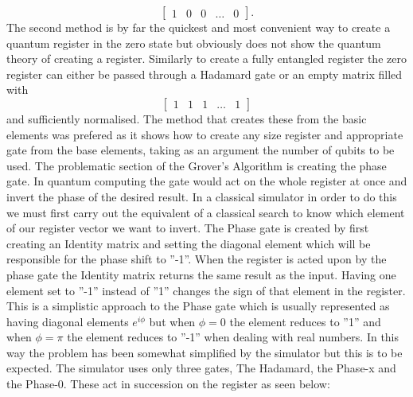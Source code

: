\documentclass[12pt]{report}
\begin{document}
\begin{equation}
\left[
\begin{array} {ccccc}
1 & 0 & 0 & \hdots & 0
\end{array}
\right]
. 
\end{equation} 
The second method is by far the quickest and most convenient way to create a quantum register in the zero state but obviously does not show the quantum theory of creating a register. Similarly to create a fully entangled register the zero register can either be passed through a Hadamard gate or an empty matrix filled with \\
\begin{equation}
\left[
\begin{array} {ccccc}
1 & 1 & 1 & \hdots & 1
\end{array}
\right]
\end{equation}
and sufficiently normalised. The method that creates these from the basic elements was prefered as it shows how to create any size register and appropriate gate from the base elements, taking as an argument the number of qubits to be used. The problematic section of the Grover's Algorithm is creating the phase gate. In quantum computing the gate would act on the whole register at once and invert the phase of the desired result. In a classical simulator in order to do this we must first carry out the equivalent of a classical search to know which element of our register vector we want to invert. The Phase gate is created by first creating an Identity matrix and setting the diagonal element which will be responsible for the phase shift to ''-1''. When the register is acted upon by the phase gate the Identity matrix returns the same result as the input. Having one element set to ''-1'' instead of ''1'' changes the sign of that element in the register. This is a simplistic approach to the Phase gate which is usually represented as having diagonal elements $e^{i\phi}$ but when $\phi=0$ the element reduces to ''1'' and when $\phi=\pi$ the element reduces to ''-1'' when dealing with real numbers.  In this way the problem has been somewhat simplified by the simulator but this is to be expected. The simulator uses only three gates, The Hadamard, the Phase-x and the Phase-0. These act in succession on the register as seen below: \\ \\ 
\end{document}
